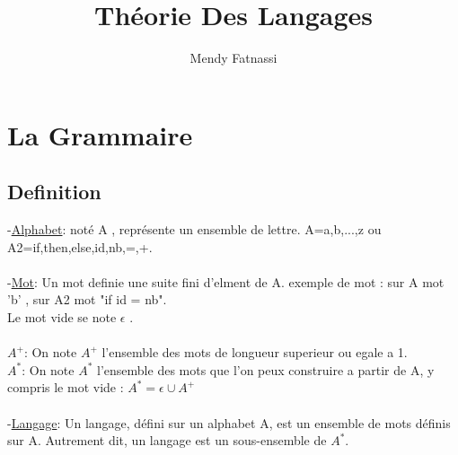 \documentclass[a4paper,12pt,openany]{book}
\author{Mendy Fatnassi}
\title{Théorie Des Langages}
\begin{document}
\maketitle
\tableofcontents

\chapter{La Grammaire}

\section{Definition}

-\underline{Alphabet}: noté A , représente un ensemble de lettre. A={a,b,...,z} ou A2={if,then,else,id,nb,=,+}.\\
\\
-\underline{Mot}: Un mot definie une suite fini d'elment de A. exemple de mot : sur A mot 'b' , sur A2 mot "if id = nb".\\
Le mot vide se note $\epsilon$ .\\
\\
\textbf{$A^+$}: On note $A^+$ l'ensemble des mots de longueur superieur ou egale a 1.\\
\textbf{$A^*$}: On note $A^*$ l'ensemble des mots que l'on peux construire a partir de A, y compris le mot vide : $A^* = {\epsilon} \cup A^+$ \\
\\
-\underline{Langage}: Un langage, défini sur un alphabet A, est un ensemble  de mots définis sur A. Autrement dit, un langage est un sous-ensemble de $A^*$.\\
\end{document}
